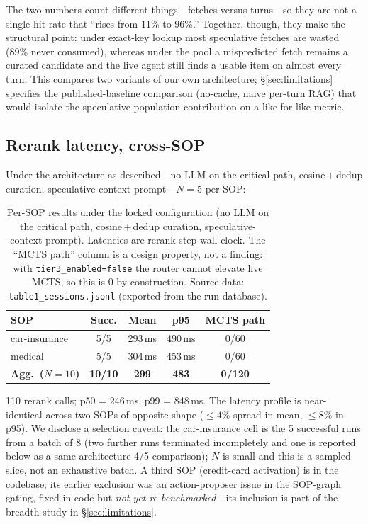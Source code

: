 \documentclass[10pt,twocolumn]{article}
\begin{document}
The two numbers count different things---fetches versus turns---so they are not a single hit-rate that ``rises from 11\% to 96\%.'' Together, though, they make the structural point: under exact-key lookup most speculative fetches are wasted (89\% never consumed), whereas under the pool a mispredicted fetch remains a curated candidate and the live agent still finds a usable item on almost every turn. This compares two variants of our own architecture; \S\ref{sec:limitations} specifies the published-baseline comparison (no-cache, naive per-turn RAG) that would isolate the speculative-population contribution on a like-for-like metric.

\subsection{Rerank latency, cross-SOP}
\label{sec:cross-sop}

Under the architecture as described---no LLM on the critical path, cosine\,+\,dedup curation, speculative-context prompt---$N{=}5$ per SOP:

\begin{table}[t]
\centering\small
\begin{tabular}{lcccc}
\toprule
SOP & Succ. & Mean & p95 & MCTS path \\
\midrule
car-insurance & 5/5 & 293\,ms & 490\,ms & 0/60 \\
medical & 5/5 & 304\,ms & 453\,ms & 0/60 \\
\midrule
\textbf{Agg.\ ($N{=}10$)} & \textbf{10/10} & \textbf{299} & \textbf{483} & \textbf{0/120} \\
\bottomrule
\end{tabular}
\caption{Per-SOP results under the locked configuration (no LLM on the critical path, cosine\,+\,dedup curation, speculative-context prompt). Latencies are rerank-step wall-clock. The ``MCTS path'' column is a design property, not a finding: with \texttt{tier3\_enabled=false} the router cannot elevate live MCTS, so this is 0 by construction. Source data: \texttt{table1\_sessions.jsonl} (exported from the run database).}
\label{tab:cross-sop}
\end{table}

110 rerank calls; p50 = 246\,ms, p99 = 848\,ms. The latency profile is near-identical across two SOPs of opposite shape ($\le 4\%$ spread in mean, $\le 8\%$ in p95). We disclose a selection caveat: the car-insurance cell is the 5 successful runs from a batch of 8 (two further runs terminated incompletely and one is reported below as a same-architecture 4/5 comparison); $N$ is small and this is a sampled slice, not an exhaustive batch. A third SOP (credit-card activation) is in the codebase; its earlier exclusion was an action-proposer issue in the SOP-graph gating, fixed in code but \emph{not yet re-benchmarked}---its inclusion is part of the breadth study in \S\ref{sec:limitations}.
\end{document}
